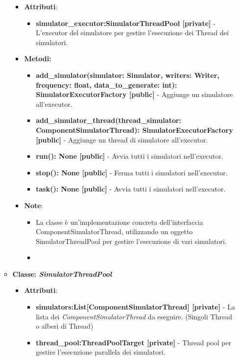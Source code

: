 \begin{itemize}
\begin{itemize}
\begin{itemize}
    \item\textbf{Attributi}:
        \begin{itemize}
        \item \textbf{simulator\_executor:SimulatorThreadPool [private]} - L'executor del simulatore per gestire l'esecuzione dei Thread dei simulatori.
    \end{itemize}
    \item \textbf{Metodi: }
    \begin{itemize}
        \item \textbf{add\_simulator(simulator: Simulator, writers: Writer, frequency: float, data\_to\_generate: int): SimulatorExecutorFactory [public]} - Aggiunge un simulatore all'executor.
        \item \textbf{add\_simulator\_thread(thread\_simulator: ComponentSimulatorThread): SimulatorExecutorFactory [public]} - Aggiunge un thread di simulatore all'executor.
        \item \textbf{run(): None [public]} - Avvia tutti i simulatori nell'executor.
        \item \textbf{stop(): None [public]} - Ferma tutti i simulatori nell'executor.
        \item \textbf{task(): None [public]} - Avvia tutti i simulatori nell'executor.
    \end{itemize}
    \item\textbf{Note}:
        \begin{itemize}
            \item La classe è un'implementazione concreta dell'interfaccia ComponentSimulatorThread, utilizzando un oggetto SimulatorThreadPool per gestire l'esecuzione di vari simulatori.
            \item 
        \end{itemize}
    \end{itemize}
    \item{\textbf{Classe: \textit{SimulatorThreadPool}}}
    \begin{itemize}
    \item\textbf{Attributi}:
        \begin{itemize}
        \item \textbf{simulators:List[ComponentSimulatorThread] [private]} - La lista dei \textit{ComponentSimulatorThread} da eseguire. (Singoli Thread o alberi di Thread)
        \item \textbf{thread\_pool:ThreadPoolTarget [private]} - Thread pool per gestire l'esecuzione parallela dei simulatori.

\end{itemize}
\end{itemize}
\end{itemize}
\end{itemize}
